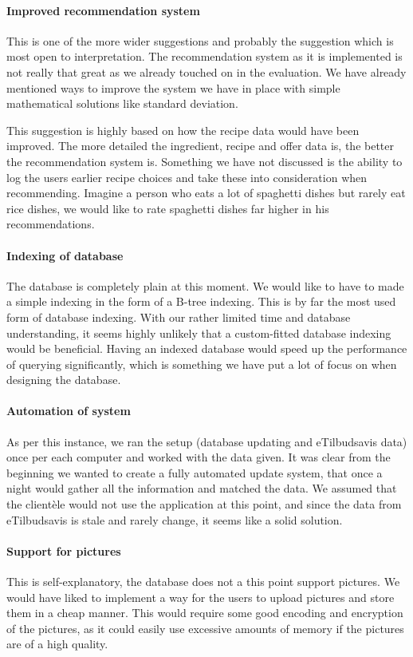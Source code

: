 \paragraph{Improved recommendation system}
This is one of the more wider suggestions and probably the suggestion which is most open to interpretation. The recommendation system as it is implemented is not really that great as we already touched on in the evaluation. We have already mentioned ways to improve the system we have in place with simple mathematical solutions like standard deviation.

This suggestion is highly based on how the recipe data would have been improved. The more detailed the ingredient, recipe and offer data is, the better the recommendation system is. Something we have not discussed is the ability to log the users earlier recipe choices and take these into consideration when recommending. Imagine a person who eats a lot of spaghetti dishes but rarely eat rice dishes, we would like to rate spaghetti dishes far higher in his recommendations.

\paragraph{Indexing of database}
The database is completely plain at this moment. We would like to have to made a simple indexing in the form of a B-tree indexing. This is by far the most used form of database indexing. With our rather limited time and database understanding, it seems highly unlikely that a custom-fitted database indexing would be beneficial. Having an indexed database would speed up the performance of querying significantly, which is something we have put a lot of focus on when designing the database.

\paragraph{Automation of system} 
As per this instance, we ran the setup (database updating and eTilbudsavis data) once per each computer and worked with the data given. It was clear from the beginning we wanted to create a fully automated update system, that once a night would gather all the information and matched the data. We assumed that the clientèle would not use the application at this point, and since the data from eTilbudsavis is stale and rarely change, it seems like a solid solution.

\paragraph{Support for pictures}
This is self-explanatory, the database does not a this point support pictures. We would have liked to implement a way for the users to upload pictures and store them in a cheap manner. This would require some good encoding and encryption of the pictures, as it could easily use excessive amounts of memory if the pictures are of a high quality.

